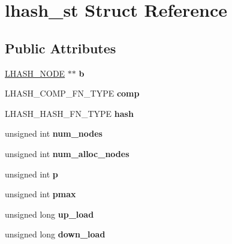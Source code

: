 \hypertarget{structlhash__st}{}\section{lhash\+\_\+st Struct Reference}
\label{structlhash__st}
\subsection*{Public Attributes}
\begin{DoxyCompactItemize}
\item 
\mbox{\label{structlhash__st_a270d10bf31f3f917e12d700b27960458}} 
\hyperlink{structlhash__node__st}{L\+H\+A\+S\+H\+\_\+\+N\+O\+DE} $\ast$$\ast$ {\bfseries b}
\item 
\mbox{\label{structlhash__st_a225e9a348c78a6e7504855c6b07ebbb5}} 
L\+H\+A\+S\+H\+\_\+\+C\+O\+M\+P\+\_\+\+F\+N\+\_\+\+T\+Y\+PE {\bfseries comp}
\item 
\mbox{\label{structlhash__st_a4621a7df2e70d17d284b8c96e487ee66}} 
L\+H\+A\+S\+H\+\_\+\+H\+A\+S\+H\+\_\+\+F\+N\+\_\+\+T\+Y\+PE {\bfseries hash}
\item 
\mbox{\label{structlhash__st_add0a7c97093083aef433f6289fbac653}} 
unsigned int {\bfseries num\+\_\+nodes}
\item 
\mbox{\label{structlhash__st_a4a908c57d4662d2db5b823f27c6c8b4c}} 
unsigned int {\bfseries num\+\_\+alloc\+\_\+nodes}
\item 
\mbox{\label{structlhash__st_aeb92fe48394859c62a9c1d80feafbcf8}} 
unsigned int {\bfseries p}
\item 
\mbox{\label{structlhash__st_a4b7d60fb615541278ab1d04b94a5d209}} 
unsigned int {\bfseries pmax}
\item 
\mbox{\label{structlhash__st_a1a393608789b64b8a28fa35bf8181ccf}} 
unsigned long {\bfseries up\+\_\+load}
\item 
\mbox{\label{structlhash__st_a7b387c1c46e865aabcad17874e18c937}} 
unsigned long {\bfseries down\+\_\+load}
$$
\end{DoxyCompactItemize}
